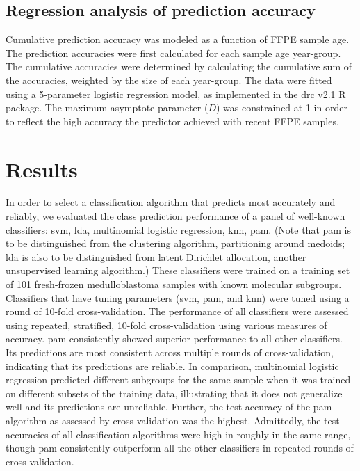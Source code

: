 \subsection{Regression analysis of prediction accuracy}

Cumulative prediction accuracy was modeled as a function of FFPE sample age. The prediction accuracies were first calculated for each sample age year-group. The cumulative accuracies were determined by calculating the cumulative sum of the accuracies, weighted by the size of each year-group. The data were fitted using a 5-parameter logistic regression model, as implemented in the drc v2.1 R package. The maximum asymptote parameter ($D$) was constrained at 1 in order to reflect the high accuracy the predictor achieved with recent FFPE samples.


\section{Results}

In order to select a classification algorithm that predicts most accurately and reliably, we evaluated the class prediction performance of a panel of well-known classifiers: \gls{svm}, \gls{lda}, multinomial logistic regression, \gls{knn}, \gls{pam}. (Note that \gls{pam} is to be distinguished from the clustering algorithm, partitioning around medoids; \gls{lda} is also to be distinguished from latent Dirichlet allocation, another unsupervised learning algorithm.)  These classifiers were trained on a training set of 101 fresh-frozen medulloblastoma samples with known molecular subgroups. Classifiers that have tuning parameters (\gls{svm}, \gls{pam}, and \gls{knn}) were tuned using a round of 10-fold cross-validation. The performance of all classifiers were assessed using repeated, stratified, 10-fold cross-validation using various measures of accuracy. \gls{pam} consistently showed superior performance to all other classifiers. Its predictions are most consistent across multiple rounds of cross-validation, indicating that its predictions are reliable. In comparison, multinomial logistic regression predicted different subgroups for the same sample when it was trained on different subsets of the training data, illustrating that it does not generalize well and its predictions are unreliable. Further, the test accuracy of the \gls{pam} algorithm as assessed by cross-validation was the highest. Admittedly, the test accuracies of all classification algorithms were high in roughly in the same range, though \gls{pam} consistently outperform all the other classifiers in repeated rounds of cross-validation.

